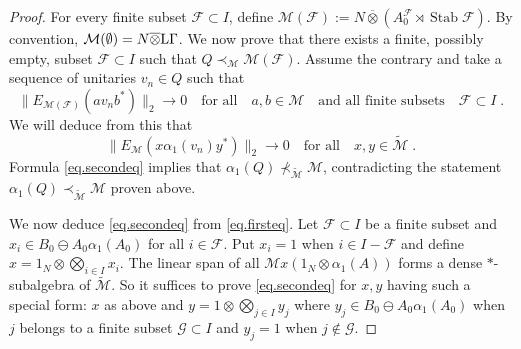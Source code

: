 \documentclass[a4paper,11pt]{amsart}
\numberwithin{equation}{section}
\begin{document}
\begin{proof}
For every finite subset ${\mathcal{F}} \subset I$, define ${\mathcal{M}}({\mathcal{F}}) := N {\mathbin{\overline{\otimes}}} (A_0^{\mathcal{F}} \rtimes {\operatorname{Stab}} {\mathcal{F}})$. By convention, ${\mathcal{M}}(\emptyset) = N {\mathbin{\overline{\otimes}}} {\mathord{\text{\rm L}}} \Gamma$. We now prove that there exists a finite, possibly empty, subset ${\mathcal{F}} \subset I$ such that $Q {\prec}_{\mathcal{M}} {\mathcal{M}}({\mathcal{F}})$. Assume the contrary and take a sequence of unitaries $v_n \in Q$ such that
\begin{equation}\label{eq.firsteq}
\|E_{{\mathcal{M}}({\mathcal{F}})}(a v_n b^*)\|_2 {\rightarrow} 0 \quad\text{for all}\quad a, b \in {\mathcal{M}} \quad\text{and all finite subsets}\quad {\mathcal{F}} \subset I \; .
\end{equation}
We will deduce from this that
\begin{equation}\label{eq.secondeq}
\|E_{\mathcal{M}}(x {\alpha}_1(v_n) y^*)\|_2 {\rightarrow} 0 \quad\text{for all}\quad x,y \in {\widetilde{\mathcal{M}}} \; .
\end{equation}
Formula \eqref{eq.secondeq} implies that ${\alpha}_1(Q) \not\prec_{\widetilde{\mathcal{M}}} {\mathcal{M}}$, contradicting the statement ${\alpha}_1(Q) \prec_{\widetilde{\mathcal{M}}} {\mathcal{M}}$ proven above.

We now deduce \eqref{eq.secondeq} from \eqref{eq.firsteq}. Let ${\mathcal{F}} \subset I$ be a finite subset and $x_i \in B_0 \ominus A_0 {\alpha}_1(A_0)$ for all $i \in {\mathcal{F}}$. Put $x_i = 1$ when $i \in I - {\mathcal{F}}$ and define $x = 1_N {\otimes} \bigotimes_{i \in I} x_i$. The linear span of all ${\mathcal{M}} x (1_N {\otimes} {\alpha}_1(A))$ forms a dense $*$-subalgebra of ${\widetilde{\mathcal{M}}}$. So it suffices to prove \eqref{eq.secondeq} for $x,y$ having such a special form: $x$ as above and $y = 1 {\otimes} \bigotimes_{j \in I} y_j$ where $y_j \in B_0 \ominus A_0 {\alpha}_1(A_0)$ when $j$ belongs to a finite subset ${\mathcal{G}} \subset I$ and $y_j = 1$ when $j \not\in {\mathcal{G}}$.


\end{proof}
\end{document}
